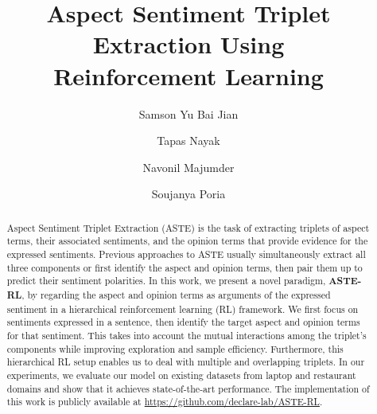 \documentclass[sigconf]{acmart}
\begin{document}
\fancyhead{}

\title{Aspect Sentiment Triplet Extraction Using\\ Reinforcement Learning}


\author{Samson Yu Bai Jian}

\author{Tapas Nayak}

\author{Navonil Majumder}

\author{Soujanya Poria}
\renewcommand{\shortauthors}{Yu et al.}
\newcommand{\mymodel}{ASTE-RL}

\begin{abstract}
Aspect Sentiment Triplet Extraction (ASTE) is the task of extracting triplets of aspect terms, their associated sentiments, and the opinion terms that provide evidence for the expressed sentiments. Previous approaches to ASTE usually simultaneously extract all three components or first identify the aspect and opinion terms, then pair them up to predict their sentiment polarities. In this work, we present a novel paradigm, \textbf{\mymodel{}}, by regarding the aspect and opinion terms as arguments of the expressed sentiment in a hierarchical reinforcement learning (RL) framework. We first focus on sentiments expressed in a sentence, then identify the target aspect and opinion terms for that sentiment. This takes into account the mutual interactions among the triplet's components while improving exploration and sample efficiency. Furthermore, this hierarchical RL setup enables us to deal with multiple and overlapping triplets. In our experiments, we evaluate our model on existing datasets from laptop and restaurant domains and show that it achieves state-of-the-art performance. The implementation of this work is publicly available at \url{https://github.com/declare-lab/ASTE-RL}.
\end{abstract}







\maketitle
\end{document}
